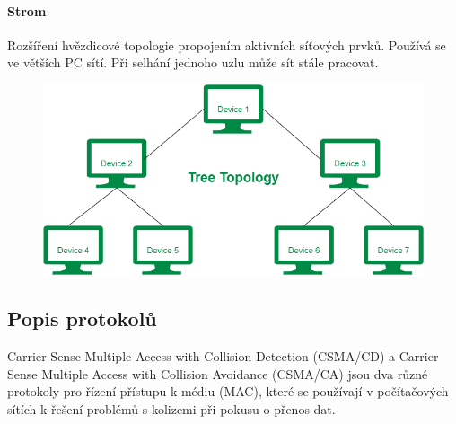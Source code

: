 \paragraph{Strom}
Rozšíření hvězdicové topologie propojením aktivních síťových prvků. Používá se ve větších PC sítí. Při selhání jednoho uzlu může sít stále pracovat.
\begin{figure}[h]
\centering
\includegraphics[scale=0.1]{sections/10_kom_roz_dat_sit/images/tree.png}
\end{figure}

\subsection{Popis protokolů}
Carrier Sense Multiple Access with Collision Detection (CSMA/CD) a Carrier Sense Multiple Access with Collision Avoidance (CSMA/CA) jsou dva různé protokoly pro řízení přístupu k médiu (MAC), které se používají v počítačových sítích k řešení problémů s kolizemi při pokusu o přenos dat.

